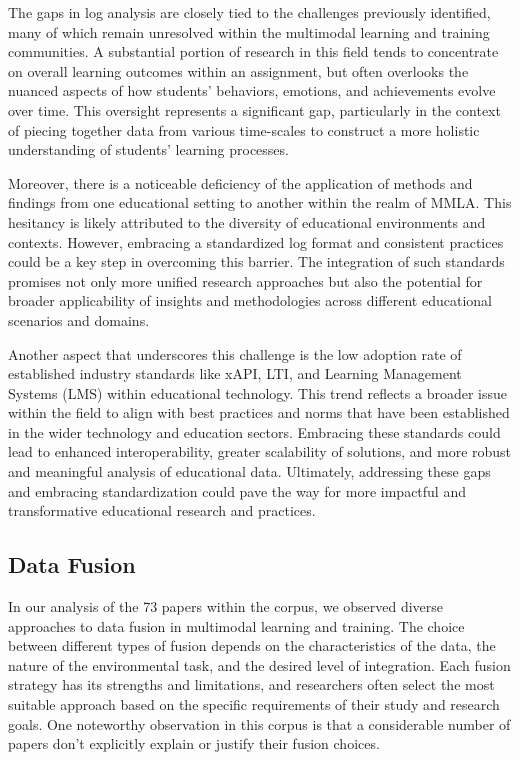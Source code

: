 \documentclass[manuscript,screen,review]{acmart}
\begin{document}
The gaps in log analysis are closely tied to the challenges previously identified, many of which remain unresolved within the multimodal learning and training communities. A substantial portion of research in this field tends to concentrate on overall learning outcomes within an assignment, but often overlooks the nuanced aspects of how students' behaviors, emotions, and achievements evolve over time. This oversight represents a significant gap, particularly in the context of piecing together data from various time-scales to construct a more holistic understanding of students' learning processes.

Moreover, there is a noticeable deficiency of the application of methods and findings from one educational setting to another within the realm of MMLA. This hesitancy is likely attributed to the diversity of educational environments and contexts. However, embracing a standardized log format and consistent practices could be a key step in overcoming this barrier. The integration of such standards promises not only more unified research approaches but also the potential for broader applicability of insights and methodologies across different educational scenarios and domains.

Another aspect that underscores this challenge is the low adoption rate of established industry standards like xAPI, LTI, and Learning Management Systems (LMS) within educational technology. This trend reflects a broader issue within the field to align with best practices and norms that have been established in the wider technology and education sectors. Embracing these standards could lead to enhanced interoperability, greater scalability of solutions, and more robust and meaningful analysis of educational data. Ultimately, addressing these gaps and embracing standardization could pave the way for more impactful and transformative educational research and practices.

    
\subsection{Data Fusion}



In our analysis of the 73 papers within the corpus, we observed diverse approaches to data fusion in multimodal learning and training. The choice between different types of fusion depends on the characteristics of the data, the nature of the environmental task, and the desired level of integration. Each fusion strategy has its strengths and limitations, and researchers often select the most suitable approach based on the specific requirements of their study and research goals. One noteworthy observation in this corpus is that a considerable number of papers don't explicitly explain or justify their fusion choices.
\end{document}
